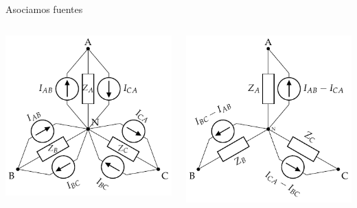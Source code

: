 \documentclass[aspectratio=169, usenames,svgnames,dvipsnames]{beamer}
\begin{document}
\begin{frame}[label={sec:orge60c377}]{Asociamos fuentes}
\begin{columns}
\begin{column}{0.5\columnwidth}
\begin{center}
\includegraphics[width=\textwidth]{../figs/GeneradorRealTriangulo_Transformado1.pdf}
\end{center}
\end{column}


\begin{column}{0.5\columnwidth}
\begin{center}
\includegraphics[width=\textwidth]{../figs/GeneradorRealTriangulo_Transformado2.pdf}
\end{center}
\end{column}
\end{columns}
\end{frame}
\end{document}
